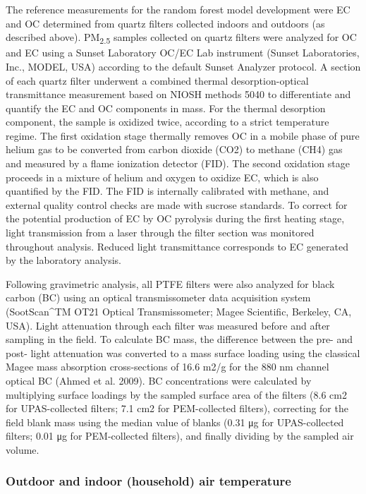 \documentclass[
  letterpaper,
  DIV=11,
  numbers=noendperiod]{scrartcl}
\begin{document}
The reference measurements for the random forest model development were
EC and OC determined from quartz filters collected indoors and outdoors
(as described above). PM\textsubscript{2.5} samples collected on quartz
filters were analyzed for OC and EC using a Sunset Laboratory OC/EC Lab
instrument (Sunset Laboratories, Inc., MODEL, USA) according to the
default Sunset Analyzer protocol. A section of each quartz filter
underwent a combined thermal desorption-optical transmittance
measurement based on NIOSH methods 5040 to differentiate and quantify
the EC and OC components in mass. For the thermal desorption component,
the sample is oxidized twice, according to a strict temperature regime.
The first oxidation stage thermally removes OC in a mobile phase of pure
helium gas to be converted from carbon dioxide (CO2) to methane (CH4)
gas and measured by a flame ionization detector (FID). The second
oxidation stage proceeds in a mixture of helium and oxygen to oxidize
EC, which is also quantified by the FID. The FID is internally
calibrated with methane, and external quality control checks are made
with sucrose standards. To correct for the potential production of EC by
OC pyrolysis during the first heating stage, light transmission from a
laser through the filter section was monitored throughout analysis.
Reduced light transmittance corresponds to EC generated by the
laboratory analysis.

Following gravimetric analysis, all PTFE filters were also analyzed for
black carbon (BC) using an optical transmissometer data acquisition
system (SootScan\^{}TM OT21 Optical Transmissometer; Magee Scientific,
Berkeley, CA, USA). Light attenuation through each filter was measured
before and after sampling in the field. To calculate BC mass, the
difference between the pre- and post- light attenuation was converted to
a mass surface loading using the classical Magee mass absorption
cross-sections of 16.6 m2/g for the 880 nm channel optical BC (Ahmed et
al. 2009). BC concentrations were calculated by multiplying surface
loadings by the sampled surface area of the filters (8.6 cm2 for
UPAS-collected filters; 7.1 cm2 for PEM-collected filters), correcting
for the field blank mass using the median value of blanks (0.31 μg for
UPAS-collected filters; 0.01 μg for PEM-collected filters), and finally
dividing by the sampled air volume.

\hypertarget{outdoor-and-indoor-household-air-temperature}{%
\subsubsection{Outdoor and indoor (household) air
temperature}\label{outdoor-and-indoor-household-air-temperature}}
\end{document}
